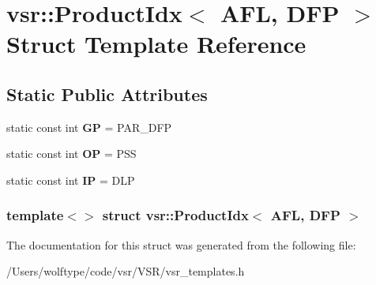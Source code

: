 \hypertarget{structvsr_1_1_product_idx_3_01_a_f_l_00_01_d_f_p_01_4}{\section{vsr\-:\-:Product\-Idx$<$ A\-F\-L, D\-F\-P $>$ Struct Template Reference}
\label{structvsr_1_1_product_idx_3_01_a_f_l_00_01_d_f_p_01_4}
}
\subsection*{Static Public Attributes}
\begin{DoxyCompactItemize}
\item 
\hypertarget{structvsr_1_1_product_idx_3_01_a_f_l_00_01_d_f_p_01_4_a1672033206ff7c0950f217d336999dbe}{static const int {\bfseries G\-P} = P\-A\-R\-\_\-\-D\-F\-P}\label{structvsr_1_1_product_idx_3_01_a_f_l_00_01_d_f_p_01_4_a1672033206ff7c0950f217d336999dbe}

\item 
\hypertarget{structvsr_1_1_product_idx_3_01_a_f_l_00_01_d_f_p_01_4_a2008c919d8b28586d2c9caeddf15be47}{static const int {\bfseries O\-P} = P\-S\-S}\label{structvsr_1_1_product_idx_3_01_a_f_l_00_01_d_f_p_01_4_a2008c919d8b28586d2c9caeddf15be47}

\item 
\hypertarget{structvsr_1_1_product_idx_3_01_a_f_l_00_01_d_f_p_01_4_a45b9fb97992b6c7ca421d82ab4639085}{static const int {\bfseries I\-P} = D\-L\-P}\label{structvsr_1_1_product_idx_3_01_a_f_l_00_01_d_f_p_01_4_a45b9fb97992b6c7ca421d82ab4639085}

\end{DoxyCompactItemize}
\subsubsection*{template$<$$>$ struct vsr\-::\-Product\-Idx$<$ A\-F\-L, D\-F\-P $>$}



The documentation for this struct was generated from the following file\-:\begin{DoxyCompactItemize}
\item 
/\-Users/wolftype/code/vsr/\-V\-S\-R/vsr\-\_\-templates.\-h\end{DoxyCompactItemize}
